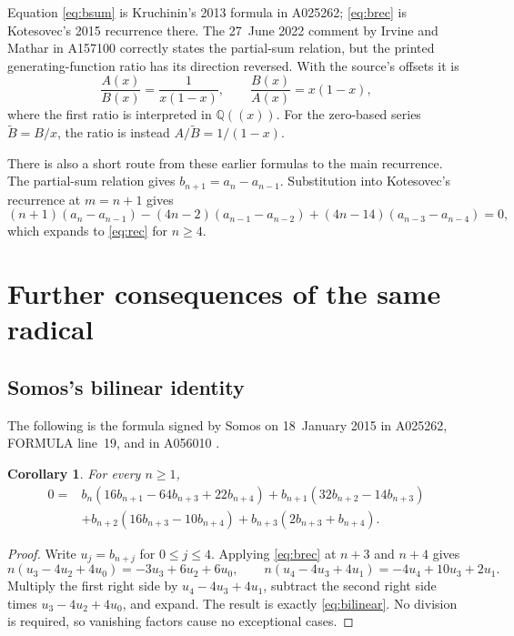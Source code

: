 \documentclass[11pt]{article}
\newtheorem{corollary}[theorem]{Corollary}
\newcommand{\Q}{\mathbb{Q}}
\begin{document}
Equation \eqref{eq:bsum} is Kruchinin's 2013 formula in A025262;
\eqref{eq:brec} is Kotesovec's 2015 recurrence there.
The 27~June 2022 comment by Irvine and Mathar in A157100
correctly states the partial-sum relation, but the printed
generating-function ratio has its direction reversed. With the source's
offsets it is
\[
 \frac{A(x)}{B(x)}=\frac1{x(1-x)},\qquad
 \frac{B(x)}{A(x)}=x(1-x),
\]
where the first ratio is interpreted in $\Q((x))$.
For the zero-based series $\widetilde B=B/x$, the ratio is instead
$A/\widetilde B=1/(1-x)$.

There is also a short route from these earlier formulas to the main
recurrence. The partial-sum relation gives
$b_{n+1}=a_n-a_{n-1}$. Substitution into Kotesovec's recurrence
at $m=n+1$ gives
\[
 (n+1)(a_n-a_{n-1})-(4n-2)(a_{n-1}-a_{n-2})
 +(4n-14)(a_{n-3}-a_{n-4})=0,
\]
which expands to \eqref{eq:rec} for $n\geq4$.

\section{Further consequences of the same radical}

\subsection{Somos's bilinear identity}

The following is the formula signed by Somos on 18~January 2015 in
A025262, FORMULA line~19, and in A056010 \cite{oeisb,oeisl}.

\begin{corollary}\label{cor:bilinear}
For every $n\geq1$,
\begin{equation}\label{eq:bilinear}
\begin{split}
0={}&b_n(16b_{n+1}-64b_{n+3}+22b_{n+4})
       +b_{n+1}(32b_{n+2}-14b_{n+3})\\
   &+b_{n+2}(16b_{n+3}-10b_{n+4})
       +b_{n+3}(2b_{n+3}+b_{n+4}).
\end{split}
\end{equation}
\end{corollary}
\begin{proof}
Write $u_j=b_{n+j}$ for $0\leq j\leq4$. Applying
\eqref{eq:brec} at $n+3$ and $n+4$ gives
\[
 n(u_3-4u_2+4u_0)=-3u_3+6u_2+6u_0,
 \qquad
 n(u_4-4u_3+4u_1)=-4u_4+10u_3+2u_1.
\]
Multiply the first right side by $u_4-4u_3+4u_1$, subtract
the second right side times $u_3-4u_2+4u_0$, and expand.
The result is exactly \eqref{eq:bilinear}. No division is required,
so vanishing factors cause no exceptional cases.
\end{proof}
\end{document}

